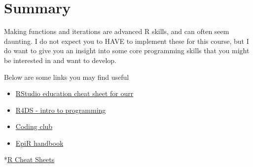 \documentclass[
]{book}
\begin{document}
\hypertarget{summary-1}{%
\section{Summary}\label{summary-1}}

Making functions and iterations are advanced R skills, and can often seem daunting. I do not expect you to HAVE to implement these for this course, but I do want to give you an insight into some core programming skills that you might be interested in and want to develop.

Below are some links you may find useful

\begin{itemize}
\item
  \href{https://www.rstudio.com/resources/cheatsheets/}{RStudio education cheat sheet for ourr}
\item
  \href{https://r4ds.had.co.nz/program-intro.html}{R4DS - intro to programming}
\item
  \href{https://ourcodingclub.github.io/tutorials/funandloops/\#function}{Coding club}
\item
  \href{https://epirhandbook.com/en/iteration-loops-and-lists.html}{EpiR handbook}
\end{itemize}

*\href{https://www.rstudio.com/resources/cheatsheets/}{R Cheat Sheets}

  
\end{document}
